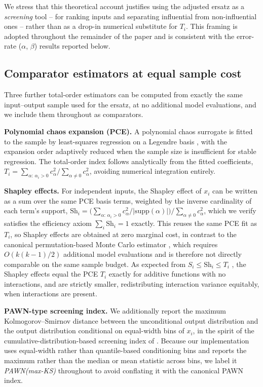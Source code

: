 \documentclass[12pt]{article}
\begin{document}
We stress that this theoretical account justifies using the adjusted ersatz as a \emph{screening} tool -- for ranking inputs and separating influential from non-influential ones -- rather than as a drop-in numerical substitute for $T_i$. This framing is adopted throughout the remainder of the paper and is consistent with the error-rate ($\alpha$, $\beta$) results reported below.

\subsection{Comparator estimators at equal sample cost}
\label{comparators}

Three further total-order estimators can be computed from exactly the same input--output sample used for the ersatz, at no additional model evaluations, and we include them throughout as comparators.

\textbf{Polynomial chaos expansion (PCE).} A polynomial chaos surrogate is fitted to the sample by least-squares regression on a Legendre basis \citep{sudret_global_2008}, with the expansion order adaptively reduced when the sample size is insufficient for stable regression. The total-order index follows analytically from the fitted coefficients, $T_i = \sum_{\alpha:\,\alpha_i>0} c_\alpha^2 \big/ \sum_{\alpha \ne 0} c_\alpha^2$, avoiding numerical integration entirely.

\textbf{Shapley effects.} For independent inputs, the Shapley effect of $x_i$ can be written as a sum over the same PCE basis terms, weighted by the inverse cardinality of each term's support, $\mathrm{Sh}_i = \big(\sum_{\alpha:\,\alpha_i>0} c_\alpha^2/|\mathrm{supp}(\alpha)|\big)\big/\sum_{\alpha\ne0}c_\alpha^2$, which we verify satisfies the efficiency axiom $\sum_i \mathrm{Sh}_i = 1$ exactly. This reuses the same PCE fit as $T_i$, so Shapley effects are obtained at zero marginal cost, in contrast to the canonical permutation-based Monte Carlo estimator \citep{song2016shapley}, which requires $O(k(k-1)/2)$ additional model evaluations and is therefore not directly comparable on the same sample budget. As expected from $S_i \le \mathrm{Sh}_i \le T_i$ \citep{owen2014}, the Shapley effects equal the PCE $T_i$ exactly for additive functions with no interactions, and are strictly smaller, redistributing interaction variance equitably, when interactions are present.

\textbf{PAWN-type screening index.} We additionally report the maximum Kolmogorov--Smirnov distance between the unconditional output distribution and the output distribution conditional on equal-width bins of $x_i$, in the spirit of the cumulative-distribution-based screening index of \citet{pianosiwagener2015}. Because our implementation uses equal-width rather than quantile-based conditioning bins and reports the maximum rather than the median or mean statistic across bins, we label it \textit{PAWN(max-KS)} throughout to avoid conflating it with the canonical PAWN index.
\end{document}
